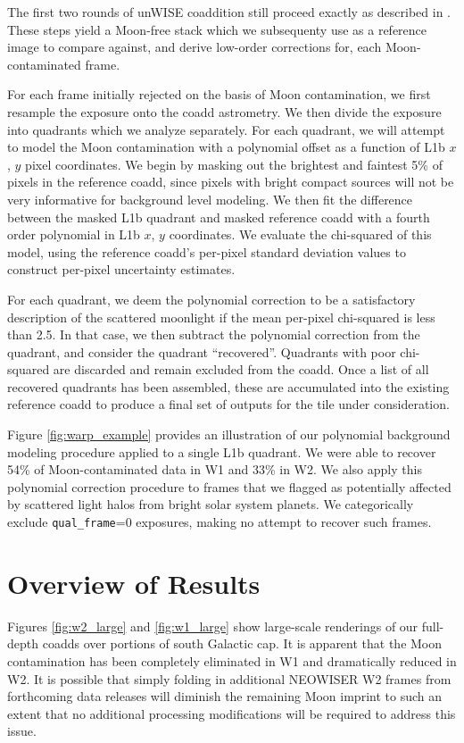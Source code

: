 \documentclass{emulateapj}
\begin{document}
The first two rounds of unWISE coaddition still proceed exactly as 
described in \cite{lang14}. These steps yield a Moon-free stack which we 
subsequenty use as a reference image to compare against, and derive low-order 
corrections for, each Moon-contaminated frame.

For each frame initially rejected on the basis of Moon contamination, we 
first resample the exposure onto the coadd astrometry. We then divide
the exposure into quadrants which we analyze separately. For each quadrant,
we will attempt to model the Moon contamination with a polynomial 
offset as a function of L1b $x$, $y$ pixel coordinates. We begin by masking out 
the brightest and faintest 5\% of pixels in the reference coadd, since pixels
with bright compact sources will not be very informative for background level
modeling. We then fit the difference between the masked L1b quadrant and masked
reference coadd with a fourth order polynomial in L1b $x$, $y$ coordinates. We 
evaluate the chi-squared of this model, using the reference coadd's per-pixel
standard deviation values to construct per-pixel uncertainty estimates.

For each quadrant, we deem the polynomial correction to be a satisfactory 
description of the scattered moonlight if the mean per-pixel chi-squared is 
less than 2.5. In that case, we then subtract the polynomial correction from 
the quadrant, and consider the quadrant ``recovered''. Quadrants with poor 
chi-squared are discarded and remain excluded from the coadd. Once a list of 
all recovered quadrants has been assembled, these are accumulated into the 
existing reference coadd to produce a final set of outputs for the tile under 
consideration.

Figure \ref{fig:warp_example} provides an illustration of our polynomial 
background modeling procedure applied to a single L1b quadrant. We were able to 
recover 54\% of Moon-contaminated data in W1 and 33\% in W2. We also apply this
polynomial correction procedure to frames that we flagged as potentially 
affected by scattered light halos from bright solar system planets. We
categorically exclude \verb|qual_frame|=0 exposures, making no attempt to 
recover such frames.

\section{Overview of Results}
\label{sec:results}

Figures \ref{fig:w2_large} and \ref{fig:w1_large} show large-scale renderings 
of our full-depth coadds over portions of south Galactic cap. It is apparent 
that the Moon contamination has been completely eliminated in
W1 and dramatically reduced in W2. It is possible that simply folding in 
additional NEOWISER W2 frames from forthcoming data releases will diminish the 
remaining Moon imprint to such an extent that no additional processing 
modifications will be required to address this issue.
\end{document}
